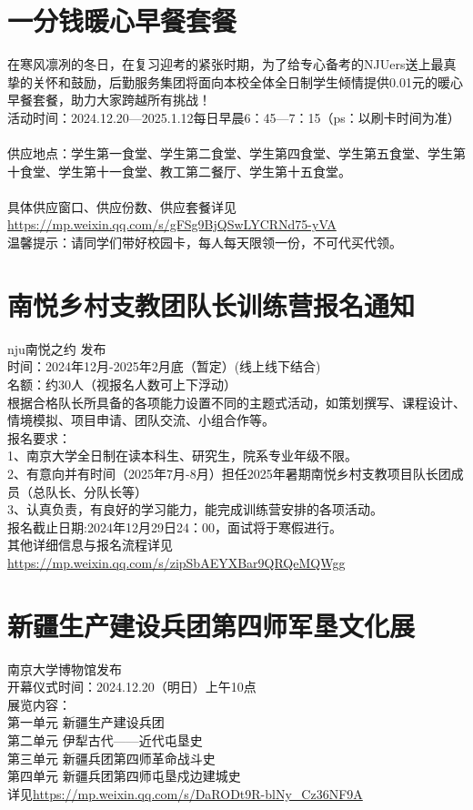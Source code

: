 \documentclass[letterpaper, 12pt]{article}
\begin{document}
\begin{multicols}{2}
\section{一分钱暖心早餐套餐}
在寒风凛冽的冬日，在复习迎考的紧张时期，为了给专心备考的NJUers送上最真挚的关怀和鼓励，后勤服务集团将面向本校全体全日制学生倾情提供0.01元的暖心早餐套餐，助力大家跨越所有挑战！\\
活动时间：2024.12.20—2025.1.12每日早晨6：45—7：15（ps：以刷卡时间为准）\\\\
供应地点：学生第一食堂、学生第二食堂、学生第四食堂、学生第五食堂、学生第十食堂、学生第十一食堂、教工第二餐厅、学生第十五食堂。\\\\
具体供应窗口、供应份数、供应套餐详见\url{https://mp.weixin.qq.com/s/gFSg9BjQSwLYCRNd75-yVA}\\
温馨提示：请同学们带好校园卡，每人每天限领一份，不可代买代领。
\section{南悦乡村支教团队长训练营报名通知}
nju南悦之约 发布\\
时间：2024年12月-2025年2月底（暂定）(线上线下结合)\\
名额：约30人（视报名人数可上下浮动）\\
根据合格队长所具备的各项能力设置不同的主题式活动，如策划撰写、课程设计、情境模拟、项目申请、团队交流、小组合作等。\\
报名要求：\\
1、南京大学全日制在读本科生、研究生，院系专业年级不限。\\
2、有意向并有时间（2025年7月-8月）担任2025年暑期南悦乡村支教项目队长团成员（总队长、分队长等）\\
3、认真负责，有良好的学习能力，能完成训练营安排的各项活动。\\
报名截止日期:2024年12月29日24：00，面试将于寒假进行。\\
其他详细信息与报名流程详见\url{https://mp.weixin.qq.com/s/zipSbAEYXBar9QRQeMQWgg}\\

\section{新疆生产建设兵团第四师军垦文化展}
南京大学博物馆发布\\
开幕仪式时间：2024.12.20（明日）上午10点\\
展览内容：\\
第一单元 新疆生产建设兵团 \\
第二单元 伊犁古代——近代屯垦史 \\
第三单元 新疆兵团第四师革命战斗史 \\
第四单元 新疆兵团第四师屯垦戍边建城史 \\
详见\url{https://mp.weixin.qq.com/s/DaRODt9R-blNy_Cz36NF9A}

\end{multicols}
\end{document}
